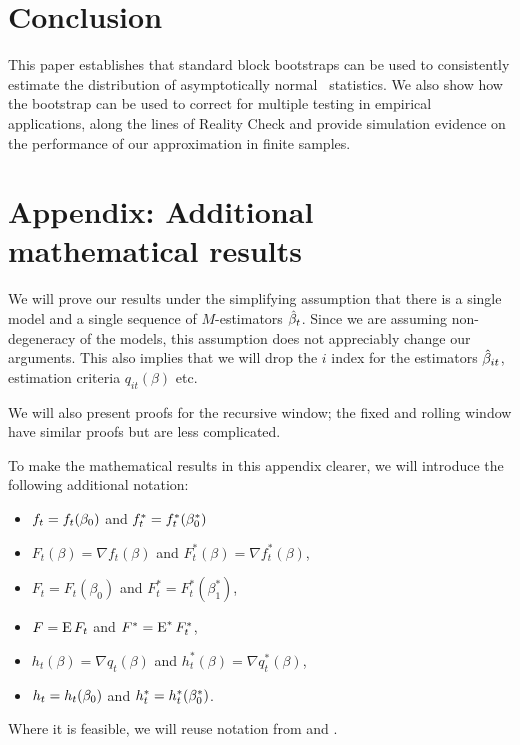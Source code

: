 \documentclass[12pt,fleqn]{article}
\begin{document}
\section{Conclusion}\label{sec:4}
This paper establishes that standard block bootstraps can be used to
consistently estimate the distribution of asymptotically normal \oos\
statistics. We also show how the bootstrap can be used to correct for
multiple testing in empirical applications, along the lines of
 Reality Check and provide simulation evidence on the
performance of our approximation in finite samples.

\appendix
\section*{Appendix: Additional mathematical results}\label{sec:B}
\renewcommand{\thesubsection}{\Alph{subsection}}

We will prove our results under the simplifying assumption that there
is a single model and a single sequence of $M$-estimators $\hat \beta_t$. Since we are assuming
non-degeneracy of the models, this assumption does not appreciably
change our arguments. This also implies that we will drop the $i$
index for the estimators $\hat \beta_{it}$, estimation criteria
$q_{it}(\beta)$ etc.

We will also present proofs for the recursive window; the fixed and
rolling window have similar proofs but are less complicated.

To make the mathematical results in this appendix clearer, we will
introduce the following additional notation:
\begin{itemize}
\item $f_t = f_t(\beta_0)$ and $f_t^* = f_t^*(\beta_0^*)$
\item $F_t(\beta) = \nabla f_t(\beta)$ and $F_t^*(\beta) = \nabla
  f_t^*(\beta)$,
\item $F_t = F_t(\beta_0)$ and $F_t^* = F_t^*(\beta_1^*)$,
\item $F = \operatorname{E} F_t$ and $F^* = \operatorname{E}^* F_t^*$,
\item $h_t(\beta) = \nabla q_t(\beta)$ and $h_t^*(\beta) = \nabla q_t^*(\beta)$,
\item $h_t = h_t(\beta_0)$ and $h_t^* = h_t^*(\beta_0^*)$.
\end{itemize}
Where it is feasible, we will reuse notation from \cite{Wes:96} and
\cite{WeM:98}.
\end{document}
